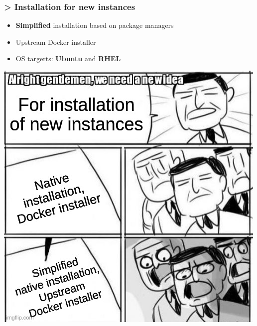 \begin{frame}
    \frametitle{> Installation for new instances}
    \begin{minipage}{0.52\textwidth}
        \begin{itemize}
            \item \textbf{Simplified} installation based on package managers
            \item Upstream Docker installer
            \item OS targerts: \textbf{Ubuntu} and \textbf{RHEL}
        \end{itemize}
    \end{minipage}%
    \begin{minipage}{0.48\textwidth}
        \begin{center}
            \includegraphics[width=0.99\linewidth]{pictures/new-installation.jpeg}
        \end{center}
    \end{minipage}
\end{frame}


